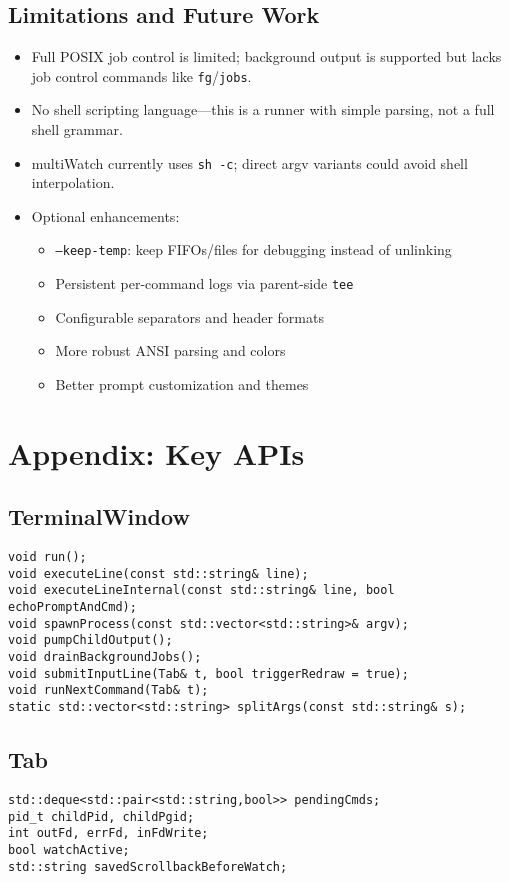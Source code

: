 \documentclass[11pt,a4paper]{article}
\begin{document}
\subsection{Limitations and Future Work}
\begin{itemize}[leftmargin=*]
  \item Full POSIX job control is limited; background output is supported but lacks job control commands like \texttt{fg}/\texttt{jobs}.
  \item No shell scripting language---this is a runner with simple parsing, not a full shell grammar.
  \item multiWatch currently uses \texttt{sh -c}; direct argv variants could avoid shell interpolation.
  \item Optional enhancements:
    \begin{itemize}
      \item \texttt{--keep-temp}: keep FIFOs/files for debugging instead of unlinking
      \item Persistent per-command logs via parent-side \texttt{tee}
      \item Configurable separators and header formats
      \item More robust ANSI parsing and colors
      \item Better prompt customization and themes
    \end{itemize}
\end{itemize}

\section{Appendix: Key APIs}
\subsection{TerminalWindow}
\begin{lstlisting}[style=code]
void run();
void executeLine(const std::string& line);
void executeLineInternal(const std::string& line, bool echoPromptAndCmd);
void spawnProcess(const std::vector<std::string>& argv);
void pumpChildOutput();
void drainBackgroundJobs();
void submitInputLine(Tab& t, bool triggerRedraw = true);
void runNextCommand(Tab& t);
static std::vector<std::string> splitArgs(const std::string& s);
\end{lstlisting}

\subsection{Tab}
\begin{lstlisting}[style=code]
std::deque<std::pair<std::string,bool>> pendingCmds;
pid_t childPid, childPgid;
int outFd, errFd, inFdWrite;
bool watchActive;
std::string savedScrollbackBeforeWatch;
\end{lstlisting}
\end{document}
